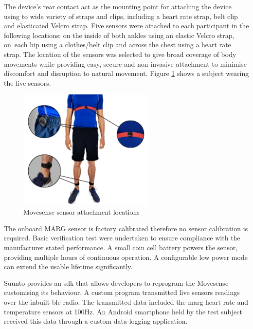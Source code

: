 The device's rear contact act as the mounting point for attaching the device using to wide variety of straps and clips, including a heart rate strap, belt clip and elasticated Velcro strap. Five sensors were attached to each participant in the following locations: on the inside of both ankles using an elastic Velcro strap, on~each hip using a clothes/belt clip and across the chest using a heart rate strap. The location of the sensors was selected to give broad coverage of body movements while providing easy, secure and non-invasive attachment to minimise discomfort and disruption to natural movement. Figure \ref{fig:methods-movesense-sensor-locations} shows a subject wearing the five sensors.

\begin{figure}[hbt]
    \centering
    \includegraphics[width=0.6\textwidth]{content/3-Methods/sensor_locations.png}
    \caption{Movesense sensor attachment locations \cite{Sherratt2021}}
    \label{fig:methods-movesense-sensor-locations}
\end{figure}

The onboard MARG sensor is factory calibrated therefore no sensor calibration is required. Basic verification test were undertaken to ensure compliance with the manufacturer stated performance. A small coin cell battery powers the sensor, providing multiple hours of continuous operation. A configurable low power mode can extend the usable lifetime significantly.

Suunto provides an \acrfull{sdk} that allows developers to reprogram the Movesense customising its behaviour. A custom program transmitted live sensors readings over the inbuilt \acrshort{ble} radio. The transmitted data included the \acrshort{marg} heart rate and temperature sensors at 100Hz. An Android smartphone held by the test subject received this data through a custom data-logging application.

